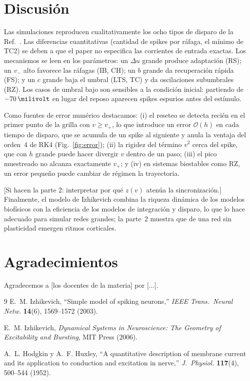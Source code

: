 \documentclass[10pt,a4paper,twocolumn]{article}
\begin{document}
\section{Discusión}
Las simulaciones reproducen cualitativamente los ocho tipos de disparo de la
Ref.~\cite{izhikevich2003}. Las diferencias cuantitativas (cantidad de spikes
por ráfaga, el mínimo de TC2) se deben a que el paper no especifica las
corrientes de entrada exactas. Los mecanismos se leen en los parámetros: un
$\Delta u$ grande produce adaptación (RS); un $v_-$ alto favorece las ráfagas
(IB, CH); un $b$ grande da recuperación rápida (FS); y un $c$ grande baja el
umbral (LTS, TC) y da oscilaciones subumbrales (RZ). Los casos de umbral bajo
son sensibles a la condición inicial: partiendo de $\SI{-70}{\milivolt}$ en lugar
del reposo aparecen spikes espurios antes del estímulo.

Como fuentes de error numérico destacamos: (i) el reseteo se detecta recién en
el primer punto de la grilla con $v\geq v_+$, lo que introduce un error
$\mathcal{O}(h)$ en cada tiempo de disparo, que se acumula de un spike al
siguiente y anula la ventaja del orden~4 de RK4 (Fig.~\ref{fig:error});
(ii) la rigidez del término $v^2$ cerca del spike, que con $h$ grande puede
hacer divergir $v$ dentro de un paso; (iii) el pico muestreado no alcanza
exactamente $v_+$; y (iv) en sistemas biestables como RZ, un error pequeño
puede cambiar de régimen la trayectoria.

[Si hacen la parte 2: interpretar por qué $z(v)$ atenúa la sincronización.]
Finalmente, el modelo de Izhikevich combina la riqueza dinámica de los modelos
biofísicos con la eficiencia de los modelos de integración y disparo, lo que lo
hace adecuado para simular redes grandes; la parte~2 muestra que de una red
sin plasticidad emergen ritmos corticales. %

\section*{Agradecimientos}
Agradecemos a [los docentes de la materia] por [...].

\begin{thebibliography}{9}\small
{}
  E.~M. Izhikevich, ``Simple model of spiking neurons,''
  \emph{IEEE Trans.\ Neural Netw.} \textbf{14}(6), 1569--1572 (2003).

  E.~M. Izhikevich, \emph{Dynamical Systems in Neuroscience: The Geometry of
  Excitability and Bursting}, MIT Press (2006).

  A.~L. Hodgkin y A.~F. Huxley, ``A quantitative description of membrane
  current and its application to conduction and excitation in nerve,''
  \emph{J.\ Physiol.} \textbf{117}(4), 500--544 (1952).
\end{thebibliography}
\end{document}
